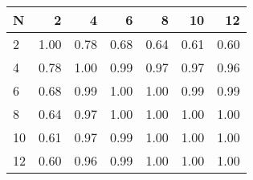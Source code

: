 \begin{tabular}{lrrrrrr}
\toprule
N &    2  &    4  &    6  &    8  &    10 &    12 \\
\midrule
2  &  1.00 &  0.78 &  0.68 &  0.64 &  0.61 &  0.60 \\
4  &  0.78 &  1.00 &  0.99 &  0.97 &  0.97 &  0.96 \\
6  &  0.68 &  0.99 &  1.00 &  1.00 &  0.99 &  0.99 \\
8  &  0.64 &  0.97 &  1.00 &  1.00 &  1.00 &  1.00 \\
10 &  0.61 &  0.97 &  0.99 &  1.00 &  1.00 &  1.00 \\
12 &  0.60 &  0.96 &  0.99 &  1.00 &  1.00 &  1.00 \\
\bottomrule
\end{tabular}

